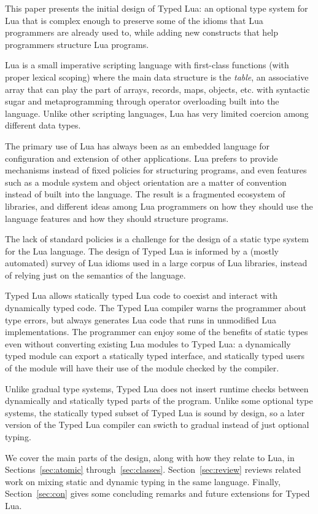 \documentclass{sig-alternate}
\begin{document}
This paper presents the initial design of Typed Lua:
an optional type system for Lua that is complex enough to
preserve some of the idioms that Lua programmers are already
used to, while adding new constructs that help programmers
structure Lua programs.

Lua is a small imperative scripting language with first-class
functions (with proper lexical scoping) where the main data
structure is the {\em table}, an associative array that can
play the part of arrays, records, maps, objects, etc.
with syntactic sugar and metaprogramming through operator overloading built into
the language. Unlike other scripting languages, Lua has very
limited coercion among different data types.

The primary use of Lua has always been as an embedded language
for configuration and extension of other applications.
Lua prefers to provide mechanisms instead of fixed policies
for structuring programs, and even features
such as a module system and object orientation are a matter of 
convention instead of built into the language.
The result is a fragmented ecosystem of libraries, and
different ideas among Lua programmers on how they should use
the language features and how they should structure programs.

The lack of standard policies
is a challenge for the design of a static type system for the Lua
language. The design of Typed Lua is informed by a (mostly
automated) survey of Lua idioms used in a large corpus of Lua
libraries, instead of relying just on the semantics of the
language.

Typed Lua allows statically typed Lua code to coexist and
interact with dynamically typed code. The Typed Lua compiler
warns the programmer about type errors, but always generates
Lua code that runs in unmodified Lua implementations. The
programmer can enjoy some of the benefits of static types even
without converting existing Lua modules to Typed Lua:
a dynamically typed module can export a statically typed
interface, and statically typed users of the module will have
their use of the module checked by the compiler.

Unlike gradual type systems, Typed Lua does not insert runtime
checks between dynamically and statically typed parts of the
program. Unlike some optional type systems, the statically
typed subset of Typed Lua is sound by design, so a later
version of the Typed Lua compiler can swicth to gradual
instead of just optional typing.

We cover the main parts of the design, along with
how they relate to Lua, in Sections~\ref{sec:atomic}
through~\ref{sec:classes}. Section~\ref{sec:review} reviews
related work on mixing static and dynamic typing in the same
language. Finally, Section~\ref{sec:con} gives some
concluding remarks and future extensions for Typed Lua.
\end{document}
